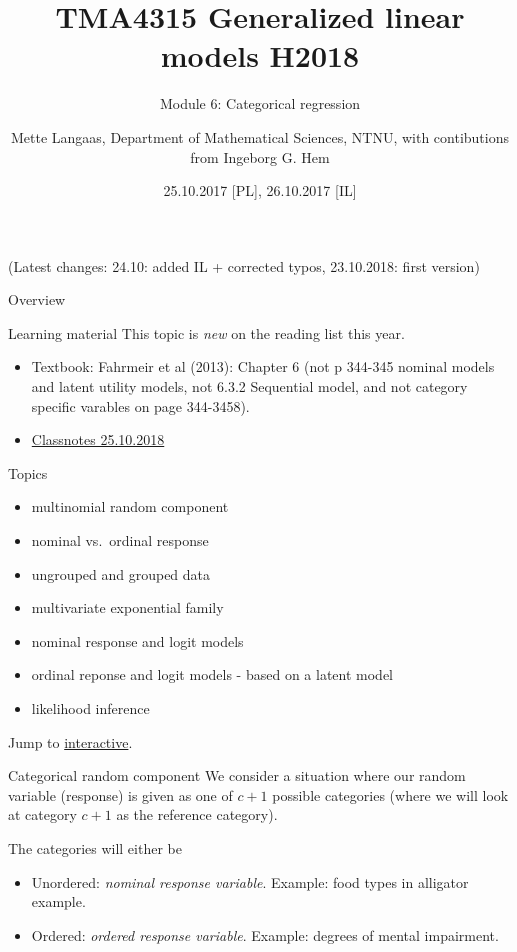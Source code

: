 \documentclass[
  ignorenonframetext,
]{beamer}
\title{TMA4315 Generalized linear models H2018}
\subtitle{Module 6: Categorical regression}
\author{Mette Langaas, Department of Mathematical Sciences, NTNU, with
contibutions from Ingeborg G. Hem}
\date{25.10.2017 {[}PL{]}, 26.10.2017 {[}IL{]}}
\providecommand{\tightlist}{%
  \setlength{\itemsep}{0pt}\setlength{\parskip}{0pt}}
\begin{document}
\frame{\titlepage}

\begin{frame}
(Latest changes: 24.10: added IL + corrected typos, 23.10.2018: first
version)
\end{frame}

\begin{frame}{Overview}
\protect\hypertarget{overview}{}
\begin{block}{Learning material}
\protect\hypertarget{learning-material}{}
This topic is \emph{new} on the reading list this year.

\begin{itemize}
\tightlist
\item
  Textbook: Fahrmeir et al (2013): Chapter 6 (not p 344-345 nominal
  models and latent utility models, not 6.3.2 Sequential model, and not
  category specific varables on page 344-3458).
\item
  \href{https://www.math.ntnu.no/emner/TMA4315/2018h/M62018.pdf}{Classnotes
  25.10.2018}
\end{itemize}
\end{block}
\end{frame}

\begin{frame}
\begin{block}{Topics}
\protect\hypertarget{topics}{}
\begin{itemize}
\item
  multinomial random component
\item
  nominal vs.~ordinal response
\item
  ungrouped and grouped data
\item
  multivariate exponential family
\item
  nominal response and logit models
\item
  ordinal reponse and logit models - based on a latent model
\item
  likelihood inference
\end{itemize}

Jump to \protect\hyperlink{interactive}{interactive}.
\end{block}
\end{frame}

\begin{frame}{Categorical random component}
\protect\hypertarget{categorical-random-component}{}
We consider a situation where our random variable (response) is given as
one of \(c+1\) possible categories (where we will look at category
\(c+1\) as the reference category).

The categories will either be

\begin{itemize}
\tightlist
\item
  Unordered: \emph{nominal response variable}. Example: food types in
  alligator example.
\item
  Ordered: \emph{ordered response variable}. Example: degrees of mental
  impairment.
\end{itemize}
\end{frame}
\end{document}
